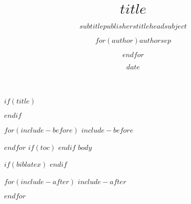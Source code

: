 \documentclass[
    numbers=noenddot,
    open=any,
    paper=a4,
    oneside,
    pagesize,
    captions=tableabove,
    bibliography=totoc,
    $if(fontsize)$$fontsize$$endif$
    $for(classoption)$$classoption$$sep$,$endfor$]{scrbook}
\title{$title$}
\subtitle{$subtitle$}
\subtitle{$publishers$}
\subtitle{$titlehead$}
\subtitle{$subject$}
\author{$for(author)$$author$$sep$ \and $endfor$}
\date{$date$}
\begin{document}
$if(title)$
\maketitle
$endif$

$for(include-before)$
$include-before$

$endfor$
$if(toc)$
\tableofcontents
$endif$
$body$

$if(biblatex)$
    \printbibliography[heading=bibintoc]
$endif$

$for(include-after)$
$include-after$

$endfor$
\end{document}
